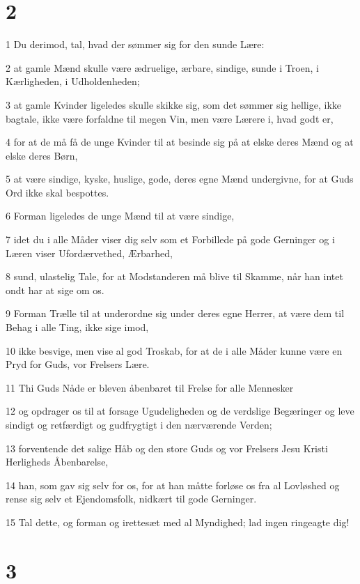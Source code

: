 \chapter{2}

\par 1 Du derimod, tal, hvad der sømmer sig for den sunde Lære:
\par 2 at gamle Mænd skulle være ædruelige, ærbare, sindige, sunde i Troen, i Kærligheden, i Udholdenheden;
\par 3 at gamle Kvinder ligeledes skulle skikke sig, som det sømmer sig hellige, ikke bagtale, ikke være forfaldne til megen Vin, men være Lærere i, hvad godt er,
\par 4 for at de må få de unge Kvinder til at besinde sig på at elske deres Mænd og at elske deres Børn,
\par 5 at være sindige, kyske, huslige, gode, deres egne Mænd undergivne, for at Guds Ord ikke skal bespottes.
\par 6 Forman ligeledes de unge Mænd til at være sindige,
\par 7 idet du i alle Måder viser dig selv som et Forbillede på gode Gerninger og i Læren viser Ufordærvethed, Ærbarhed,
\par 8 sund, ulastelig Tale, for at Modstanderen må blive til Skamme, når han intet ondt har at sige om os.
\par 9 Forman Trælle til at underordne sig under deres egne Herrer, at være dem til Behag i alle Ting, ikke sige imod,
\par 10 ikke besvige, men vise al god Troskab, for at de i alle Måder kunne være en Pryd for Guds, vor Frelsers Lære.
\par 11 Thi Guds Nåde er bleven åbenbaret til Frelse for alle Mennesker
\par 12 og opdrager os til at forsage Ugudeligheden og de verdslige Begæringer og leve sindigt og retfærdigt og gudfrygtigt i den nærværende Verden;
\par 13 forventende det salige Håb og den store Guds og vor Frelsers Jesu Kristi Herligheds Åbenbarelse,
\par 14 han, som gav sig selv for os, for at han måtte forløse os fra al Lovløshed og rense sig selv et Ejendomsfolk, nidkært til gode Gerninger.
\par 15 Tal dette, og forman og irettesæt med al Myndighed; lad ingen ringeagte dig!

\chapter{3}


